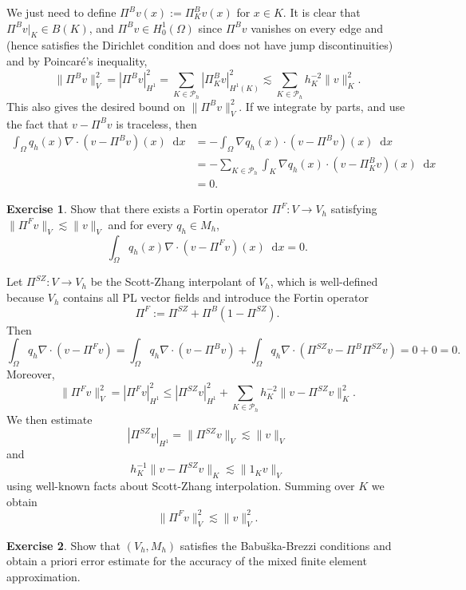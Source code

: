 \documentclass[10pt]{article}
\newcommand*\dif{\mathop{}\!\mathrm{d}}
\theoremstyle{definition}
\newtheorem{exer}{Exercise}
\begin{document}
We just need to define $\Pi^B v(x) := \Pi^B_K v(x)$ for $x \in K$. It is clear that $\Pi^B v|_K \in B(K)$, and $\Pi^B v \in H^1_0(\Omega)$ since $\Pi^B v$ vanishes on every edge and (hence satisfies the Dirichlet condition and does not have jump discontinuities) and by Poincar\'e's inequality,
$$\|\Pi^B v\|_V^2 = |\Pi^B v|_{H^1}^2 = \sum_{K \in \mathcal P_h} |\Pi^B_K v|_{H^1(K)}^2 \lesssim \sum_{K \in \mathcal P_h} h_K^{-2} \|v\|_K^2.$$
This also gives the desired bound on $\|\Pi^B v\|_V^2$.
If we integrate by parts, and use the fact that $v - \Pi^B v$ is traceless, then
\begin{align*}
    \int_\Omega q_h(x) \nabla \cdot (v - \Pi^B v)(x) \dif x 
    &= - \int_\Omega \nabla q_h(x) \cdot (v - \Pi^B v)(x) \dif x \\
    &= - \sum_{K \in \mathcal P_h} \int_K \nabla q_h(x) \cdot (v - \Pi^B_K v)(x) \dif x \\
    &= 0.
\end{align*}

\begin{exer}
    Show that there exists a Fortin operator $\Pi^F: V \to V_h$ satisfying $\|\Pi^F v\|_V \lesssim \|v\|_V$ and for every $q_h \in M_h$,
    $$\int_\Omega q_h(x) \nabla \cdot (v - \Pi^F v)(x) \dif x = 0.$$
\end{exer}

Let $\Pi^{SZ}: V \to V_h$ be the Scott-Zhang interpolant of $V_h$, which is well-defined because $V_h$ contains all PL vector fields and introduce the Fortin operator 
$$\Pi^F := \Pi^{SZ} + \Pi^B (1 - \Pi^{SZ}).$$
Then 
$$\int_\Omega q_h \nabla \cdot(v - \Pi^F v) = \int_\Omega q_h \nabla \cdot(v - \Pi^B v) + \int_\Omega q_h \nabla \cdot (\Pi^{SZ}v - \Pi^B \Pi^{SZ} v) = 0 + 0 = 0.$$
Moreover,
$$\|\Pi^F v\|_V^2 = |\Pi^F v|_{H^1}^2 \leq |\Pi^{SZ} v|_{H^1}^2 + \sum_{K \in \mathcal P_h} h_K^{-2} \|v - \Pi^{SZ}v\|_K^2.$$
We then estimate 
$$|\Pi^{SZ} v|_{H^1} = \|\Pi^{SZ} v\|_V \lesssim \|v\|_V$$
and 
$$h_K^{-1} \|v - \Pi^{SZ}v\|_K \lesssim \|1_K v\|_V$$
using well-known facts about Scott-Zhang interpolation. Summing over $K$ we obtain 
$$\|\Pi^F v\|_V^2 \lesssim \|v\|_V^2.$$

\begin{exer}
    Show that $(V_h, M_h)$ satisfies the Babuška-Brezzi conditions and obtain a priori error estimate for the accuracy of the mixed finite element approximation.
\end{exer}
\end{document}
